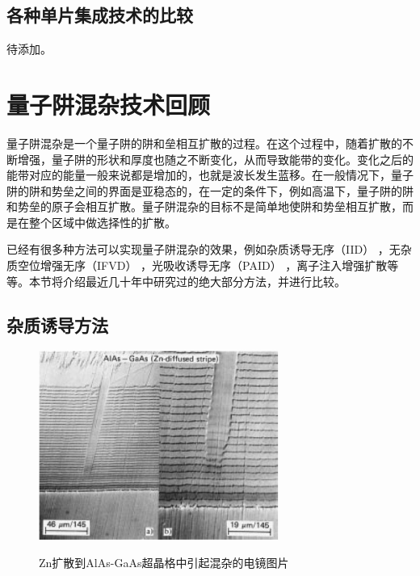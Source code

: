 \documentclass[oneside]{ZJUthesis}
\begin{document}
\subsection{各种单片集成技术的比较}

待添加。

\section{量子阱混杂技术回顾}

量子阱混杂是一个量子阱的阱和垒相互扩散的过程。在这个过程中，随着扩散的不断增强，量子阱的形状和厚度也随之不断变化，从而导致能带的变化。变化之后的能带对应的能量一般来说都是增加的，也就是波长发生蓝移。在一般情况下，量子阱的阱和势垒之间的界面是亚稳态的，在一定的条件下，例如高温下，量子阱的阱和势垒的原子会相互扩散。量子阱混杂的目标不是简单地使阱和势垒相互扩散，而是在整个区域中做选择性的扩散。

已经有很多种方法可以实现量子阱混杂的效果，例如杂质诱导无序（IID） \cite{holonyak1998impurity-IID} ，无杂质空位增强无序（IFVD） \cite{si1998area-IFVD}，光吸收诱导无序（PAID） \cite{mckee1997monolithic-PAID}，离子注入增强扩散\cite{charbonneau1998photonic-implantation}等等。本节将介绍最近几十年中研究过的绝大部分方法，并进行比较。

\subsection{杂质诱导方法}

\begin{figure}[!h]
  \centering
  \includegraphics[width=0.7\textwidth]{./Pictures/iid.eps}\\
  \caption{Zn扩散到AlAs-GaAs超晶格中引起混杂的电镜图片}
  \label{fig_iid}
\end{figure}
\end{document}
